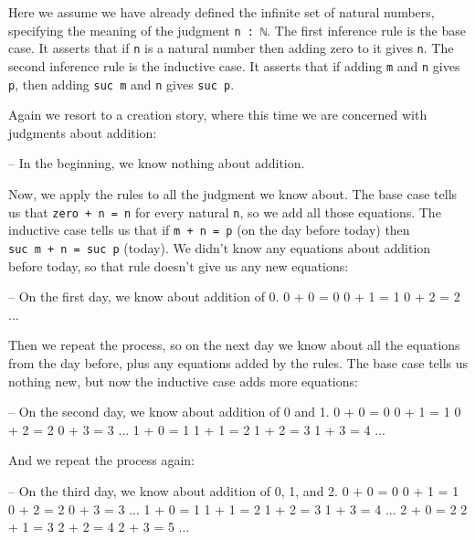 Here we assume we have already defined the infinite set of natural
numbers, specifying the meaning of the judgment \texttt{n\ :\ ℕ}. The
first inference rule is the base case. It asserts that if \texttt{n} is
a natural number then adding zero to it gives \texttt{n}. The second
inference rule is the inductive case. It asserts that if adding
\texttt{m} and \texttt{n} gives \texttt{p}, then adding \texttt{suc\ m}
and \texttt{n} gives \texttt{suc\ p}.

Again we resort to a creation story, where this time we are concerned
with judgments about addition:

\begin{myDisplay}
-- In the beginning, we know nothing about addition.
\end{myDisplay}

Now, we apply the rules to all the judgment we know about. The base case
tells us that \texttt{zero\ +\ n\ =\ n} for every natural \texttt{n}, so
we add all those equations. The inductive case tells us that if
\texttt{m\ +\ n\ =\ p} (on the day before today) then
\texttt{suc\ m\ +\ n\ =\ suc\ p} (today). We didn't know any equations
about addition before today, so that rule doesn't give us any new
equations:

\begin{myDisplay}
-- On the first day, we know about addition of 0.
0 + 0 = 0     0 + 1 = 1    0 + 2 = 2     ...
\end{myDisplay}

Then we repeat the process, so on the next day we know about all the
equations from the day before, plus any equations added by the rules.
The base case tells us nothing new, but now the inductive case adds more
equations:

\begin{myDisplay}
-- On the second day, we know about addition of 0 and 1.
0 + 0 = 0     0 + 1 = 1     0 + 2 = 2     0 + 3 = 3     ...
1 + 0 = 1     1 + 1 = 2     1 + 2 = 3     1 + 3 = 4     ...
\end{myDisplay}

And we repeat the process again:

\begin{myDisplay}
-- On the third day, we know about addition of 0, 1, and 2.
0 + 0 = 0     0 + 1 = 1     0 + 2 = 2     0 + 3 = 3     ...
1 + 0 = 1     1 + 1 = 2     1 + 2 = 3     1 + 3 = 4     ...
2 + 0 = 2     2 + 1 = 3     2 + 2 = 4     2 + 3 = 5     ...
\end{myDisplay}

